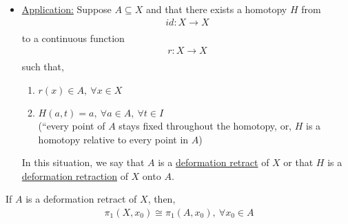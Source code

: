 \begin{itemize}
    \item
        \underline{Application:} Suppose $A\subseteq X$ and that there exists
        a homotopy $H$ from
        \begin{align*}
            id:X\rightarrow X\\
        \end{align*}
        to a continuous function
        \begin{align*}
            r: X\rightarrow X\\
        \end{align*}
        such that,
        \begin{enumerate}
            \item $r(x)\in A,\ \forall x\in X$
            \item $H(a,t)=a,\ \forall a \in A,\ \forall t\in I$\\
                (``every point of $A$ stays fixed throughout the homotopy, or,
                $H$ is a homotopy relative to every point in $A$)
        \end{enumerate}
        In this situation, we say that $A$ is a \underline{deformation retract} of $X$
        or that $H$ is a \underline{deformation retraction} of $X$ onto $A$.
    \end{itemize}
    \begin{theorem} If $A$ is a deformation retract of $X$, then,
        \begin{align*}
            \pi_1(X,x_0)\cong \pi_1(A,x_0),\ \forall x_0\in A\\
        \end{align*}
    \end{theorem}
